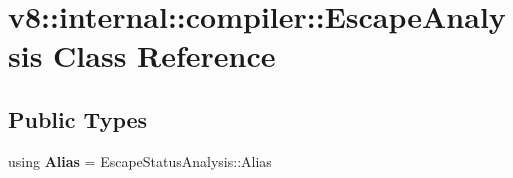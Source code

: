 \hypertarget{classv8_1_1internal_1_1compiler_1_1_escape_analysis}{}\section{v8\+:\+:internal\+:\+:compiler\+:\+:Escape\+Analysis Class Reference}
\label{classv8_1_1internal_1_1compiler_1_1_escape_analysis}
\subsection*{Public Types}
\begin{DoxyCompactItemize}
\item 
using {\bfseries Alias} = Escape\+Status\+Analysis\+::\+Alias\hypertarget{classv8_1_1internal_1_1compiler_1_1_escape_analysis_aeb378fe76e43c3549d80b0003081b75b}{}\label{classv8_1_1internal_1_1compiler_1_1_escape_analysis_aeb378fe76e43c3549d80b0003081b75b}

\end{DoxyCompactItemize}
